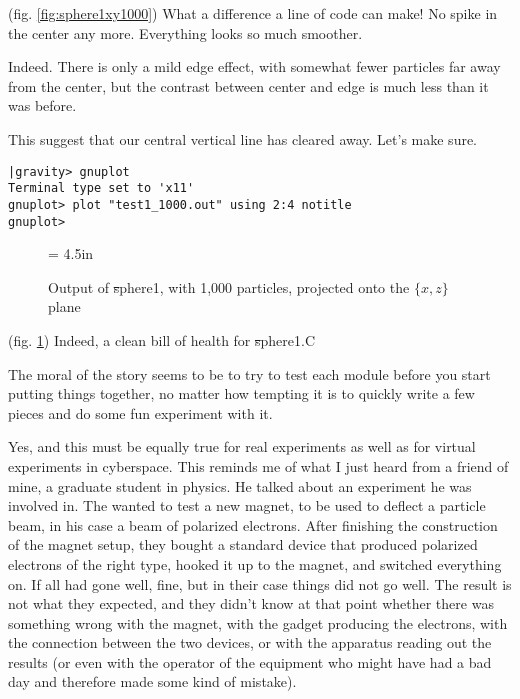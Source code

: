 \abc

\bob
(fig. \ref{fig:sphere1xy1000}) 
What a difference a line of code can make!  No spike in the center any
more.  Everything looks so much smoother.

\carol
Indeed.  There is only a mild edge effect, with somewhat fewer
particles far away from the center, but the contrast between center
and edge is much less than it was before.

\alice
This suggest that our central vertical line has cleared away.  Let's
make sure.

\cba

\begin{small}
\begin{verbatim}
|gravity> gnuplot
Terminal type set to 'x11'
gnuplot> plot "test1_1000.out" using 2:4 notitle
gnuplot>
\end{verbatim}
\end{small}

\begin{figure}[htb]
\begin{center}
\epsfxsize = 4.5in
\caption[xz plot of {\st sphere1} output]
{Output of {\st sphere1}, with 1,000 particles, projected onto the
$\{x,z\}$ plane}
\label{fig:sphere1xz1000}
\end{center}
\end{figure}

\abc

\bob
(fig. \ref{fig:sphere1xz1000}) 
Indeed, a clean bill of health for {\st sphere1.C}

\carol
The moral of the story seems to be to try to test each module before
you start putting things together, no matter how tempting it is to
quickly write a few pieces and do some fun experiment with it.

\bob
Yes, and this must be equally true for real experiments as well as for
virtual experiments in cyberspace.  This reminds me of what I just
heard from a friend of mine, a graduate student in physics.  He talked
about an experiment he was involved in.  The wanted to test a new
magnet, to be used to deflect a particle beam, in his case a beam of
polarized electrons.  After finishing the construction of the magnet
setup, they bought a standard device that produced polarized electrons
of the right type, hooked it up to the magnet, and switched everything
on.  If all had gone well, fine, but in their case things did not go
well.  The result is not what they expected, and they didn't know at
that point whether there was something wrong with the magnet, with the
gadget producing the electrons, with the connection between the two
devices, or with the apparatus reading out the results (or even with
the operator of the equipment who might have had a bad day and
therefore made some kind of mistake).


